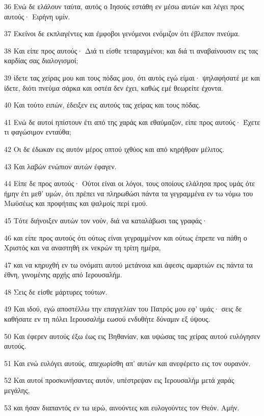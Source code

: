 \par 36 Ενώ δε ελάλουν ταύτα, αυτός ο Ιησούς εστάθη εν μέσω αυτών και λέγει προς αυτούς· Ειρήνη υμίν.
\par 37 Εκείνοι δε εκπλαγέντες και έμφοβοι γενόμενοι ενόμιζον ότι έβλεπον πνεύμα.
\par 38 Και είπε προς αυτούς· Διά τι είσθε τεταραγμένοι; και διά τι αναβαίνουσιν εις τας καρδίας σας διαλογισμοί;
\par 39 ίδετε τας χείρας μου και τους πόδας μου, ότι αυτός εγώ είμαι· ψηλαφήσατέ με και ίδετε, διότι πνεύμα σάρκα και οστέα δεν έχει, καθώς εμέ θεωρείτε έχοντα.
\par 40 Και τούτο ειπών, έδειξεν εις αυτούς τας χείρας και τους πόδας.
\par 41 Ενώ δε αυτοί ηπίστουν έτι από της χαράς και εθαύμαζον, είπε προς αυτούς· Έχετε τι φαγώσιμον ενταύθα;
\par 42 Οι δε έδωκαν εις αυτόν μέρος οπτού ιχθύος και από κηρήθραν μέλιτος.
\par 43 Και λαβών ενώπιον αυτών έφαγεν.
\par 44 Είπε δε προς αυτούς· Ούτοι είναι οι λόγοι, τους οποίους ελάλησα προς υμάς ότε ήμην έτι μεθ' υμών, ότι πρέπει να πληρωθώσι πάντα τα γεγραμμένα εν τω νόμω του Μωϋσέως και προφήταις και ψαλμοίς περί εμού.
\par 45 Τότε διήνοιξεν αυτών τον νούν, διά να καταλάβωσι τας γραφάς·
\par 46 και είπε προς αυτούς ότι ούτως είναι γεγραμμένον και ούτως έπρεπε να πάθη ο Χριστός και να αναστηθή εκ νεκρών τη τρίτη ημέρα,
\par 47 και να κηρυχθή εν τω ονόματι αυτού μετάνοια και άφεσις αμαρτιών εις πάντα τα έθνη, γινομένης αρχής από Ιερουσαλήμ.
\par 48 Σεις δε είσθε μάρτυρες τούτων.
\par 49 Και ιδού, εγώ αποστέλλω την επαγγελίαν του Πατρός μου εφ' υμάς· σεις δε καθήσατε εν τη πόλει Ιερουσαλήμ εωσού ενδυθήτε δύναμιν εξ ύψους.
\par 50 Και έφερεν αυτούς έξω έως εις Βηθανίαν, και υψώσας τας χείρας αυτού ευλόγησεν αυτούς.
\par 51 Και ενώ ευλόγει αυτούς, απεχωρίσθη απ' αυτών και ανεφέρετο εις τον ουρανόν.
\par 52 Και αυτοί προσκυνήσαντες αυτόν, υπέστρεψαν εις Ιερουσαλήμ μετά χαράς μεγάλης,
\par 53 και ήσαν διαπαντός εν τω ιερώ, αινούντες και ευλογούντες τον Θεόν. Αμήν.


